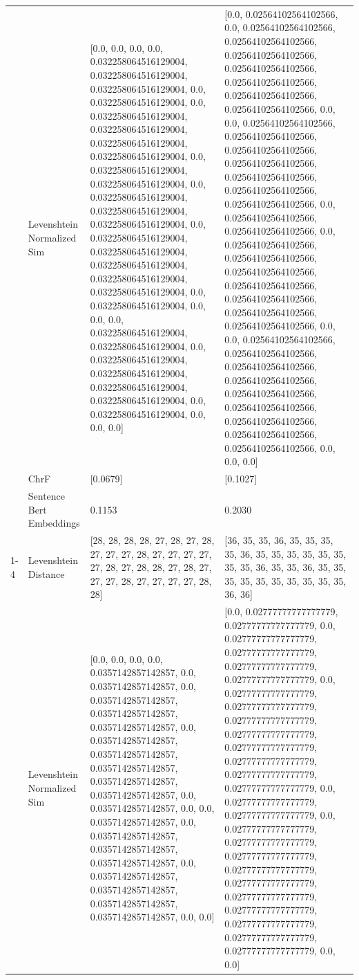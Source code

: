 \begin{tabular}{llll}
 & Levenshtein Normalized Sim & [0.0, 0.0, 0.0, 0.0, 0.032258064516129004, 0.032258064516129004, 0.032258064516129004, 0.0, 0.032258064516129004, 0.0, 0.032258064516129004, 0.032258064516129004, 0.032258064516129004, 0.032258064516129004, 0.0, 0.032258064516129004, 0.032258064516129004, 0.0, 0.032258064516129004, 0.032258064516129004, 0.032258064516129004, 0.0, 0.032258064516129004, 0.032258064516129004, 0.032258064516129004, 0.032258064516129004, 0.032258064516129004, 0.0, 0.032258064516129004, 0.0, 0.0, 0.0, 0.032258064516129004, 0.032258064516129004, 0.0, 0.032258064516129004, 0.032258064516129004, 0.032258064516129004, 0.032258064516129004, 0.0, 0.032258064516129004, 0.0, 0.0, 0.0] & [0.0, 0.02564102564102566, 0.0, 0.02564102564102566, 0.02564102564102566, 0.02564102564102566, 0.02564102564102566, 0.02564102564102566, 0.02564102564102566, 0.02564102564102566, 0.0, 0.0, 0.02564102564102566, 0.02564102564102566, 0.02564102564102566, 0.02564102564102566, 0.02564102564102566, 0.02564102564102566, 0.02564102564102566, 0.0, 0.02564102564102566, 0.02564102564102566, 0.0, 0.02564102564102566, 0.02564102564102566, 0.02564102564102566, 0.02564102564102566, 0.02564102564102566, 0.02564102564102566, 0.02564102564102566, 0.0, 0.0, 0.02564102564102566, 0.02564102564102566, 0.02564102564102566, 0.02564102564102566, 0.02564102564102566, 0.02564102564102566, 0.02564102564102566, 0.02564102564102566, 0.02564102564102566, 0.0, 0.0, 0.0] \\
 & ChrF & [0.0679] & [0.1027] \\
 & Sentence Bert Embeddings & 0.1153 & 0.2030 \\
\cline{1-4}
\multirow[t]{4}{*}{Munyaka uri mbere ya kahinga} & Levenshtein Distance & [28, 28, 28, 28, 27, 28, 27, 28, 27, 27, 27, 28, 27, 27, 27, 27, 27, 28, 27, 28, 28, 27, 28, 27, 27, 27, 28, 27, 27, 27, 27, 28, 28] & [36, 35, 35, 36, 35, 35, 35, 35, 36, 35, 35, 35, 35, 35, 35, 35, 35, 36, 35, 35, 36, 35, 35, 35, 35, 35, 35, 35, 35, 35, 35, 36, 36] \\
 & Levenshtein Normalized Sim & [0.0, 0.0, 0.0, 0.0, 0.0357142857142857, 0.0, 0.0357142857142857, 0.0, 0.0357142857142857, 0.0357142857142857, 0.0357142857142857, 0.0, 0.0357142857142857, 0.0357142857142857, 0.0357142857142857, 0.0357142857142857, 0.0357142857142857, 0.0, 0.0357142857142857, 0.0, 0.0, 0.0357142857142857, 0.0, 0.0357142857142857, 0.0357142857142857, 0.0357142857142857, 0.0, 0.0357142857142857, 0.0357142857142857, 0.0357142857142857, 0.0357142857142857, 0.0, 0.0] & [0.0, 0.02777777777777779, 0.02777777777777779, 0.0, 0.02777777777777779, 0.02777777777777779, 0.02777777777777779, 0.02777777777777779, 0.0, 0.02777777777777779, 0.02777777777777779, 0.02777777777777779, 0.02777777777777779, 0.02777777777777779, 0.02777777777777779, 0.02777777777777779, 0.02777777777777779, 0.0, 0.02777777777777779, 0.02777777777777779, 0.0, 0.02777777777777779, 0.02777777777777779, 0.02777777777777779, 0.02777777777777779, 0.02777777777777779, 0.02777777777777779, 0.02777777777777779, 0.02777777777777779, 0.02777777777777779, 0.02777777777777779, 0.0, 0.0] \\

\end{tabular}
